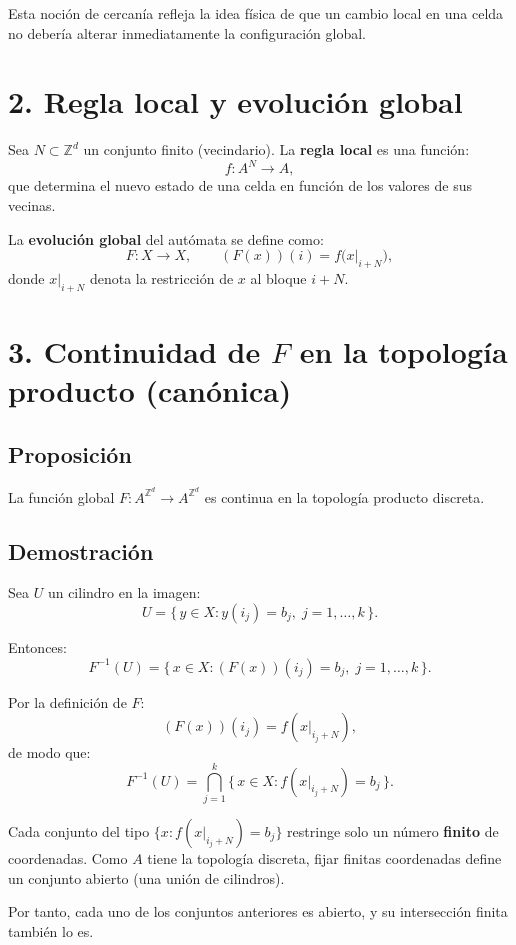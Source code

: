 \documentclass[12pt]{article}
\begin{document}
Esta noción de cercanía refleja la idea física de que un cambio local en una celda no debería alterar inmediatamente la configuración global.

\bigskip

\section*{2. Regla local y evolución global}

Sea $N \subset \mathbb{Z}^d$ un conjunto finito (vecindario).  
La \textbf{regla local} es una función:
\[
f : A^N \longrightarrow A,
\]
que determina el nuevo estado de una celda en función de los valores de sus vecinas.

La \textbf{evolución global} del autómata se define como:
\[
F : X \longrightarrow X, \qquad (F(x))(i) = f\big(x|_{i+N}\big),
\]
donde $x|_{i+N}$ denota la restricción de $x$ al bloque $i+N$.

\bigskip

\section*{3. Continuidad de $F$ en la topología producto (canónica)}

\subsection*{Proposición}
La función global $F : A^{\mathbb{Z}^d} \to A^{\mathbb{Z}^d}$ es continua en la topología producto discreta.

\subsection*{Demostración}

Sea $U$ un cilindro en la imagen:
\[
U = \{\, y \in X : y(i_j) = b_j,\; j=1,\dots,k \,\}.
\]

Entonces:
\[
F^{-1}(U)
= \{\, x \in X : (F(x))(i_j) = b_j,\; j=1,\dots,k \,\}.
\]

Por la definición de $F$:
\[
(F(x))(i_j) = f(x|_{i_j + N}),
\]
de modo que:
\[
F^{-1}(U)
= \bigcap_{j=1}^{k} \{\, x \in X : f(x|_{i_j + N}) = b_j \,\}.
\]

Cada conjunto del tipo $\{ x : f(x|_{i_j + N}) = b_j \}$ restringe solo un número \textbf{finito} de coordenadas.  
Como $A$ tiene la topología discreta, fijar finitas coordenadas define un conjunto abierto (una unión de cilindros).

Por tanto, cada uno de los conjuntos anteriores es abierto, y su intersección finita también lo es.
\end{document}
